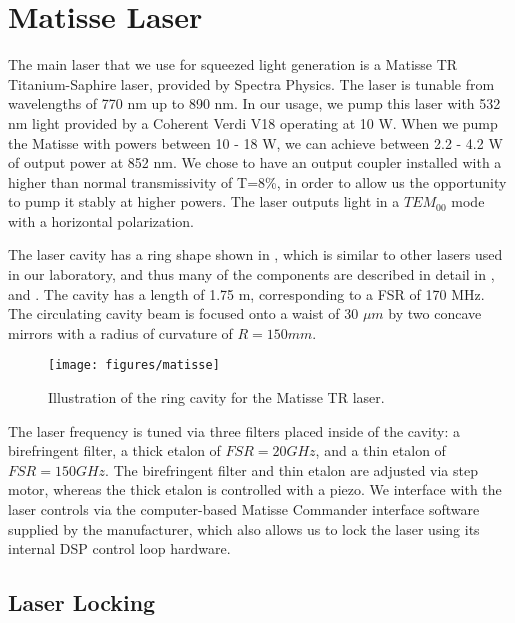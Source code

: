 \cleardoublepage

\section{Matisse Laser}
\label{appendix:matisse_laser}


The main laser that we use for squeezed light generation is a Matisse TR Titanium-Saphire laser, provided by Spectra Physics.  The laser is tunable from wavelengths of 770 nm up to 890 nm.  In our usage, we pump this laser with 532 nm light provided by a Coherent Verdi V18 operating at 10 W.  When we pump the Matisse with powers between 10 - 18 W, we can achieve between 2.2 - 4.2 W of output power at 852 nm.  We chose to have an output coupler installed with a higher than normal transmissivity of T=8\%, in order to allow us the opportunity to pump it stably at higher powers.  The laser outputs light in a $TEM_{00}$ mode with a horizontal polarization.

The laser cavity has a ring shape shown in , which is similar to other lasers used in our laboratory, and thus many of the components are described in detail in \cite{Biraben79}, and \cite{Bourzeix93}.  The cavity has a length of 1.75 m, corresponding to a FSR of 170 MHz.  The circulating cavity beam is focused onto a waist of 30 $\mu m$ by two concave mirrors with a radius of curvature of $R = 150 mm$. 

\begin{figure}[!ht] 
 \centering 
 \texttt{[image: figures/matisse]} 
 \caption[Matisse laser ring cavity]{Illustration of the ring cavity for the Matisse TR laser. \cite{sirah} } 
 \label{fig:matisse} 
\end{figure}
  
The laser frequency is tuned via three filters placed inside of the cavity:  a birefringent filter, a thick etalon of $FSR = 20 GHz$, and a thin etalon of $FSR = 150 GHz$.  The birefringent filter and thin etalon are adjusted via step motor, whereas the thick etalon is controlled with a piezo.  We interface with the laser controls via the computer-based Matisse Commander interface software supplied by the manufacturer, which also allows us to lock the laser using its internal DSP control loop hardware.

\subsection{Laser Locking} 

